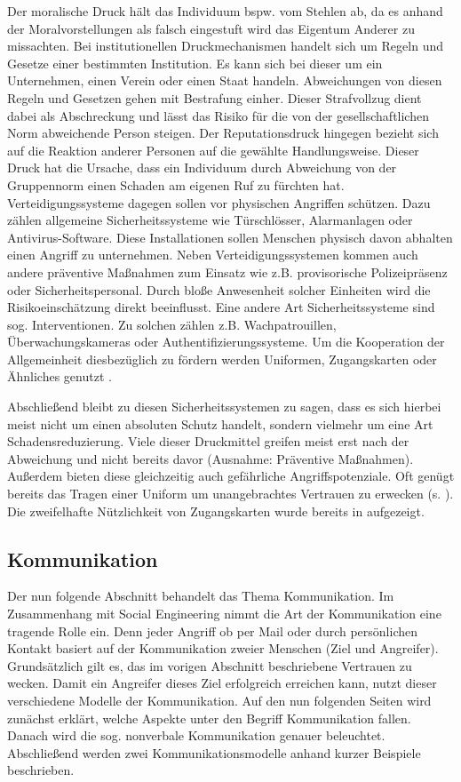 Der moralische Druck hält das Individuum bspw. vom Stehlen ab, da es anhand der Moralvorstellungen als falsch eingestuft wird das Eigentum Anderer zu missachten.
Bei institutionellen Druckmechanismen handelt sich um Regeln und Gesetze einer bestimmten Institution.
Es kann sich bei dieser um ein Unternehmen, einen Verein oder einen Staat handeln.
Abweichungen von diesen Regeln und Gesetzen gehen mit Bestrafung einher. Dieser Strafvollzug dient dabei als Abschreckung und lässt das Risiko für die von der gesellschaftlichen Norm abweichende Person steigen.
Der Reputationsdruck hingegen bezieht sich auf die Reaktion anderer Personen auf die gewählte Handlungsweise.
Dieser Druck hat die Ursache, dass ein Individuum durch Abweichung von der Gruppennorm einen Schaden am eigenen Ruf zu fürchten hat.
Verteidigungssysteme dagegen sollen vor physischen Angriffen schützen. Dazu zählen allgemeine Sicherheitssysteme wie Türschlösser, Alarmanlagen oder Antivirus-Software.
Diese Installationen sollen Menschen physisch davon abhalten einen Angriff zu unternehmen.
Neben Verteidigungssystemen kommen auch andere präventive Maßnahmen zum Einsatz wie z.B. provisorische Polizeipräsenz oder Sicherheitspersonal.
Durch bloße Anwesenheit solcher Einheiten wird die Risikoeinschätzung direkt beeinflusst.
Eine andere Art Sicherheitssysteme sind sog. Interventionen.
Zu solchen zählen z.B. Wachpatrouillen, Überwachungskameras oder Authentifizierungssysteme.
Um die Kooperation der Allgemeinheit diesbezüglich zu fördern werden Uniformen, Zugangskarten oder Ähnliches genutzt \citep{liars-and-outliers}.

Abschließend bleibt zu diesen Sicherheitssystemen zu sagen, dass es sich hierbei meist nicht um einen absoluten Schutz handelt, sondern vielmehr um eine Art Schadensreduzierung.
Viele dieser Druckmittel greifen meist erst nach der Abweichung und nicht bereits davor (Ausnahme: Präventive Maßnahmen).
Außerdem bieten diese  gleichzeitig auch gefährliche Angriffspotenziale.
Oft genügt bereits das Tragen einer Uniform um unangebrachtes Vertrauen zu erwecken (s. ). Die zweifelhafte Nützlichkeit von Zugangskarten wurde bereits in   aufgezeigt.

\subsection{Kommunikation}\label{sec:kommunikation}

Der nun folgende Abschnitt behandelt das Thema Kommunikation.
Im Zusammenhang mit Social Engineering nimmt die Art der Kommunikation eine tragende Rolle ein.
Denn jeder Angriff ob per Mail oder durch persönlichen Kontakt basiert auf der Kommunikation zweier Menschen (Ziel und Angreifer).
Grundsätzlich gilt es, das im vorigen Abschnitt beschriebene Vertrauen zu wecken.
Damit ein Angreifer dieses Ziel erfolgreich erreichen kann, nutzt dieser verschiedene Modelle der Kommunikation.
Auf den nun folgenden Seiten wird zunächst erklärt, welche Aspekte unter den Begriff Kommunikation fallen.
Danach wird die sog. nonverbale Kommunikation genauer beleuchtet.
Abschließend werden zwei Kommunikationsmodelle anhand kurzer Beispiele beschrieben.

